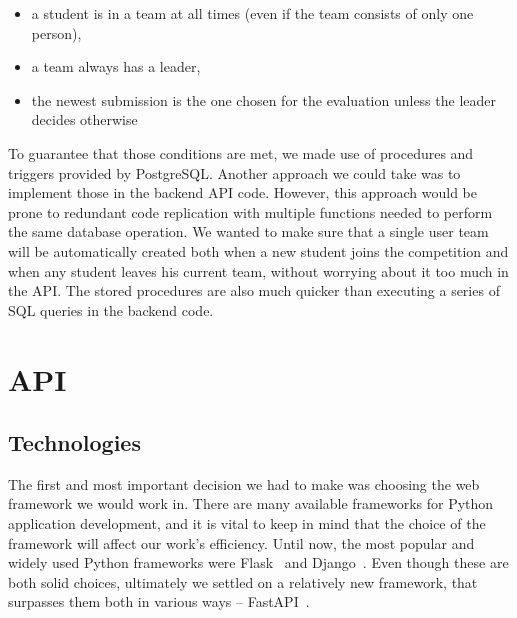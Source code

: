 \begin{itemize}  
\item a student is in a team at all times (even if the team consists of only one person),
\item a team always has a leader,
\item the newest submission is the one chosen for the evaluation unless the leader decides otherwise
\end{itemize}

To guarantee that those conditions are met, we made use of procedures and triggers provided by PostgreSQL. Another approach we could take was to implement those in the backend API code. However, this approach would be prone to redundant code replication with multiple functions needed to perform the same database operation. We wanted to make sure that a single user team will be automatically created both when a new student joins the competition and when any student leaves his current team, without worrying about it too much in the API. The stored procedures are also much quicker than executing a series of SQL queries in the backend code.

\section{API}
\subsection{Technologies}


The first and most important decision we had to make was choosing the web framework we would work in. There are many available frameworks for Python application development, and it is vital to keep in mind that the choice of the framework will affect our work's efficiency. Until now, the most popular and widely used Python frameworks were Flask~\cite{flask} and Django~\cite{django}. Even though these are both solid choices, ultimately we settled on a relatively new framework, that surpasses them both in various ways -- FastAPI~\cite{fastapi}. 


